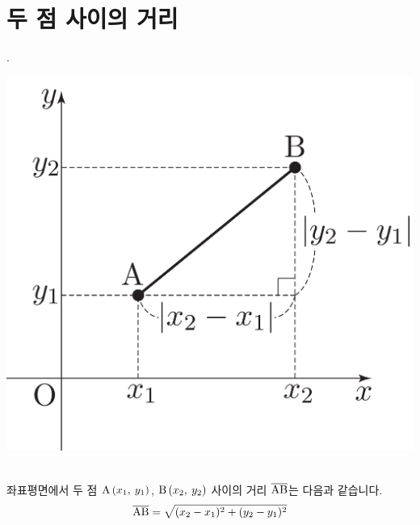 \section{두 점 사이의 거리}
{\color{white}.}\\[-1.55\blskip]\begin{center}
\includegraphics[scale=0.125]{pic0/pic144.pdf}\
\end{center}좌표평면에서 두 점 $\xy[A]{x_1}{y_1}$, $\xy[B]{x_2}{y_2}$ 사이의 거리 $\ovr{AB}$는 다음과 같습니다. \begin{align*}\ovr{AB} = \sqrt{(x_2 - x_1)^2 + (y_2 - y_1)^2}\end{align*}\\[-4.5em]
